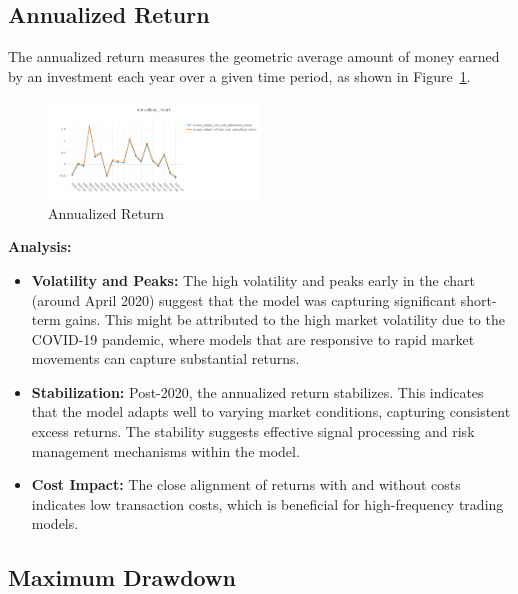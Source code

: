 \documentclass[conference]{IEEEtran}
\begin{document}
\begin{center}
    \subsection*{\textbf{Annualized Return}}
\end{center}

The annualized return measures the geometric average amount of money earned by an investment each year over a given time period, as shown in Figure~\ref{fig:annualized return}.

\begin{figure}[h!]
\centering
    \includegraphics[width=0.5\textwidth]{annualized_return.png}
    \caption{Annualized Return}
    \label{fig:annualized return}
\end{figure}

\textbf{Analysis:}
\begin{itemize}
    \item \textbf{Volatility and Peaks:} The high volatility and peaks early in the chart (around April 2020) suggest that the model was capturing significant short-term gains. This might be attributed to the high market volatility due to the COVID-19 pandemic, where models that are responsive to rapid market movements can capture substantial returns.
    \item \textbf{Stabilization:} Post-2020, the annualized return stabilizes. This indicates that the model adapts well to varying market conditions, capturing consistent excess returns. The stability suggests effective signal processing and risk management mechanisms within the model.
    \item \textbf{Cost Impact:} The close alignment of returns with and without costs indicates low transaction costs, which is beneficial for high-frequency trading models.
\end{itemize}

\begin{center}
    \subsection*{\textbf{Maximum Drawdown}}
\end{center}
\end{document}

